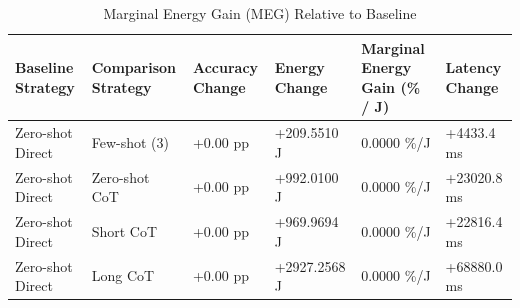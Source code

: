 \begin{table}
\caption{Marginal Energy Gain (MEG) Relative to Baseline}
\label{tab:marginal_energy_gain}
\begin{tabular}{llllll}
\toprule
Baseline Strategy & Comparison Strategy & Accuracy Change & Energy Change & Marginal Energy Gain (\% / J) & Latency Change \\
\midrule
Zero-shot Direct & Few-shot (3) & +0.00 pp & +209.5510 J & 0.0000 \%/J & +4433.4 ms \\
Zero-shot Direct & Zero-shot CoT & +0.00 pp & +992.0100 J & 0.0000 \%/J & +23020.8 ms \\
Zero-shot Direct & Short CoT & +0.00 pp & +969.9694 J & 0.0000 \%/J & +22816.4 ms \\
Zero-shot Direct & Long CoT & +0.00 pp & +2927.2568 J & 0.0000 \%/J & +68880.0 ms \\
\bottomrule
\end{tabular}
\end{table}
